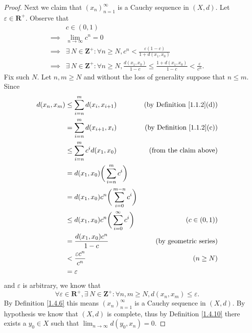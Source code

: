 \begin{proof}
    Next we claim that \((x_n)_{n = 1}^\infty\) is a Cauchy sequence in \((X, d)\).
    Let \(\varepsilon \in \mathbf{R}^+\).
    Observe that
    \begin{align*}
                 & c \in (0, 1)                                                                                                                            \\
        \implies & \lim_{n \to \infty} c^n = 0                                                                                                             \\
        \implies & \exists\ N \in \mathbf{Z}^+ : \forall n \geq N, c^n < \frac{\varepsilon (1 - c)}{1 + d(x_1, x_0)}                                       \\
        \implies & \exists\ N \in \mathbf{Z}^+ : \forall n \geq N, \frac{d(x_1, x_0)}{1 - c} \leq \frac{1 + d(x_1, x_0)}{1 - c} < \frac{\varepsilon}{c^n}.
    \end{align*}
    Fix such \(N\).
    Let \(n, m \geq N\) and without the loss of generality suppose that \(n \leq m\).
    Since
    \begin{align*}
        d(x_n, x_m) & \leq \sum_{i = n}^m d(x_i, x_{i + 1})                    & \text{(by Definition \ref{1.1.2}(d))} \\
                    & = \sum_{i = n}^m d(x_{i + 1}, x_i)                       & \text{(by Definition \ref{1.1.2}(c))} \\
                    & \leq \sum_{i = n}^m c^i d(x_1, x_0)                      & \text{(from the claim above)}         \\
                    & = d(x_1, x_0) \bigg(\sum_{i = n}^m c^i\bigg)                                                     \\
                    & = d(x_1, x_0) c^n \bigg(\sum_{i = 0}^{m - n} c^i\bigg)                                           \\
                    & \leq d(x_1, x_0) c^n \bigg(\sum_{i = 0}^\infty c^i\bigg) & (c \in (0, 1))                        \\
                    & = \frac{d(x_1, x_0) c^n}{1 - c}                          & \text{(by geometric series)}          \\
                    & < \frac{\varepsilon c^n}{c^n}                            & (n \geq N)                            \\
                    & = \varepsilon
    \end{align*}
    and \(\varepsilon\) is arbitrary, we know that
    \[
        \forall \varepsilon \in \mathbf{R}^+, \exists\ N \in \mathbf{Z}^+ : \forall n, m \geq N, d(x_n, x_m) \leq \varepsilon.
    \]
    By Definition \ref{1.4.6} this means \((x_n)_{n = 1}^\infty\) is a Cauchy sequence in \((X, d)\).
    By hypothesis we know that \((X, d)\) is complete, thus by Definition \ref{1.4.10} there exists a \(y_0 \in X\) such that \(\lim_{n \to \infty} d(y_0, x_n) = 0\).


\end{proof}
